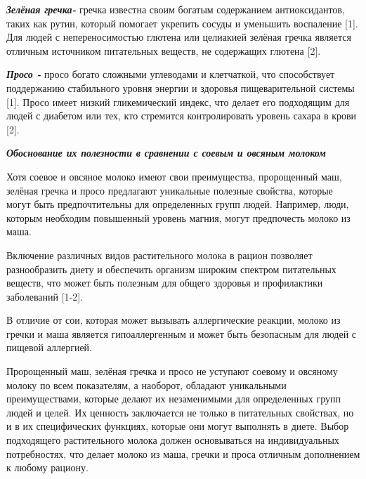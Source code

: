 \emph{{\bfseries Зелёная гречка-}} гречка известна своим богатым
содержанием антиоксидантов, таких как рутин, который помогает укрепить
сосуды и уменьшить воспаление {[}1{]}. Для людей с непереносимостью
глютена или целиакией зелёная гречка является отличным источником
питательных веществ, не содержащих глютена {[}2{]}.

\emph{{\bfseries Просо -}} просо богато сложными углеводами и клетчаткой,
что способствует поддержанию стабильного уровня энергии и здоровья
пищеварительной системы {[}1{]}. Просо имеет низкий гликемический
индекс, что делает его подходящим для людей с диабетом или тех, кто
стремится контролировать уровень сахара в крови {[}2{]}.

\emph{{\bfseries Обоснование их полезности в сравнении с соевым и овсяным
молоком}}

Хотя соевое и овсяное молоко имеют свои преимущества, пророщенный маш,
зелёная гречка и просо предлагают уникальные полезные свойства, которые
могут быть предпочтительны для определенных групп людей. Например, люди,
которым необходим повышенный уровень магния, могут предпочесть молоко из
маша.

Включение различных видов растительного молока в рацион позволяет
разнообразить диету и обеспечить организм широким спектром питательных
веществ, что может быть полезным для общего здоровья и профилактики
заболеваний {[}1-2{]}.

В отличие от сои, которая может вызывать аллергические реакции, молоко
из гречки и маша является гипоаллергенным и может быть безопасным для
людей с пищевой аллергией.

Пророщенный маш, зелёная гречка и просо не уступают соевому и овсяному
молоку по всем показателям, а наоборот, обладают уникальными
преимуществами, которые делают их незаменимыми для определенных групп
людей и целей. Их ценность заключается не только в питательных
свойствах, но и в их специфических функциях, которые они могут выполнять
в диете. Выбор подходящего растительного молока должен основываться на
индивидуальных потребностях, что делает молоко из маша, гречки и проса
отличным дополнением к любому рациону.

